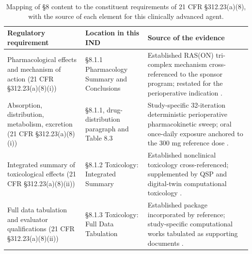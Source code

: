 \begin{table}[t]
\centering
\caption{Mapping of \S 8 content to the constituent requirements of 21 CFR
\S 312.23(a)(8), with the source of each element for this clinically advanced
agent.}
\label{tab:sec07-map}
\begin{tabularx}{\textwidth}{L{4.5cm} L{3.3cm} Y}
\toprule
\textbf{Regulatory requirement} & \textbf{Location in this IND} & \textbf{Source of the evidence} \\
\midrule
Pharmacological effects and mechanism of action (21 CFR \S 312.23(a)(8)(i)) & \S 8.1.1 Pharmacology Summary and Conclusions & Established RAS(ON) tri-complex mechanism cross-referenced to the sponsor program; restated for the perioperative indication \cite{daraxwhipple}. \\
Absorption, distribution, metabolism, excretion (21 CFR \S 312.23(a)(8)(i)) & \S 8.1.1, drug-distribution paragraph and Table 8.3 & Study-specific 32-iteration deterministic perioperative pharmacokinetic sweep; oral once-daily exposure anchored to the 300 mg reference dose \cite{onpremwhippl}. \\
Integrated summary of toxicological effects (21 CFR \S 312.23(a)(8)(ii)) & \S 8.1.2 Toxicology: Integrated Summary & Established nonclinical toxicology cross-referenced; supplemented by QSP and digital-twin computational toxicology \cite{qspmetpancre,fdadigtwinpc}. \\
Full data tabulation and evaluator qualifications (21 CFR \S 312.23(a)(8)(ii)) & \S 8.1.3 Toxicology: Full Data Tabulation & Established package incorporated by reference; study-specific computational works tabulated as supporting documents \cite{phase1guidance,daraxwhipple}. \\
\bottomrule
\end{tabularx}
\end{table}
\vspace*{-1.375cm}

